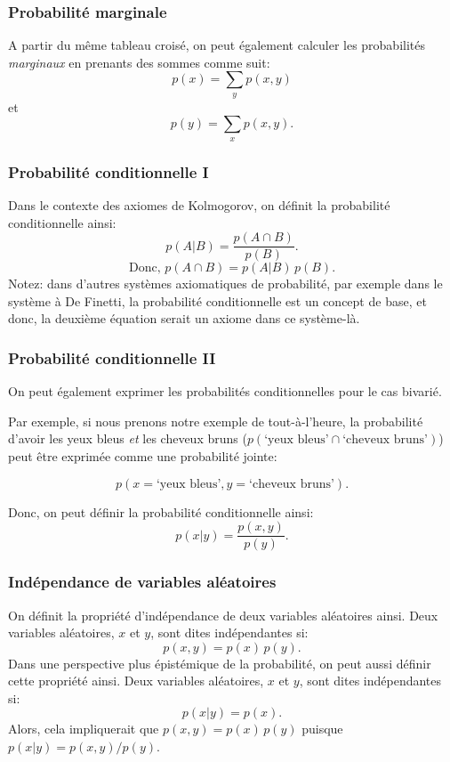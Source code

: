 \documentclass{beamer}
\begin{document}
\begin{frame}
    \frametitle{Probabilité marginale}
    A partir du même tableau croisé, on peut également calculer les probabilités \emph{marginaux} en prenants des sommes comme suit:
    \pause
    \[p(x) = \sum_y p(x,y)\]
    \pause
    et
    \[p(y) = \sum_x p(x,y).\]
\end{frame}


\begin{frame}
    \frametitle{Probabilité conditionnelle I}
    Dans le contexte des axiomes de Kolmogorov, on définit la probabilité conditionnelle ainsi:
    \[p(A | B) = \frac{p(A \cap B)}{p(B)}.\]
    \pause
    \[\textrm{Donc,} \, \, p(A \cap B) = p(A | B) \, p(B).\]
    \pause
    \vfill
    Notez: dans d'autres systèmes axiomatiques de probabilité, par exemple dans le système à De Finetti,
    la probabilité conditionnelle est un concept de base, et donc, la deuxième équation serait un axiome dans
    ce système-là.
\end{frame}


\begin{frame}
    \frametitle{Probabilité conditionnelle II}
    On peut également exprimer les probabilités conditionnelles pour le cas bivarié.

    \vfill

    \pause

    Par exemple, si nous prenons notre exemple de tout-à-l'heure, la probabilité d'avoir
    les yeux bleus \emph{et} les cheveux bruns ($p(\textrm{`yeux bleus'} \cap \textrm{`cheveux bruns'})$) peut
    être exprimée comme une probabilité jointe:

    \[p(x=\textrm{`yeux bleus'}, y=\textrm{`cheveux bruns'}).\]

    \pause

    \vfill

    Donc, on peut définir la probabilité conditionnelle ainsi:
    \[p(x | y) = \frac{p(x,y)}{p(y)}.\]
\end{frame}


\begin{frame}
    \frametitle{Indépendance de variables aléatoires}
    On définit la propriété d'indépendance de deux variables aléatoires ainsi.
    Deux variables aléatoires, $x$ et $y$, sont dites indépendantes si:
    \[p(x,y) = p(x) \, p(y).\]
    \pause
    \vfill
    Dans une perspective plus épistémique de la probabilité, on peut aussi définir cette propriété ainsi.
    Deux variables aléatoires, $x$ et $y$, sont dites indépendantes si:
    \[p(x|y) = p(x).\]
    \pause
    \vfill
    Alors, cela impliquerait que $p(x,y) = p(x) \, p(y)$ puisque $p(x|y) = p(x,y) / p(y)$.
\end{frame}
\end{document}
